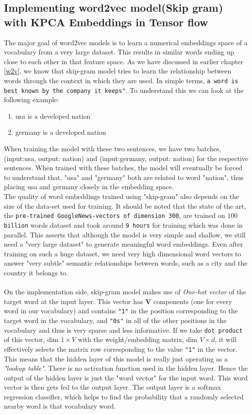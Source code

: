 \subsection{Implementing word2vec model(Skip gram) with KPCA Embeddings in Tensor flow}
The major goal of word2vec models is to learn a numerical embeddings space of a vocabulary from a very large dataset. This results in similar words ending up close to each other in that feature space. As we have discussed in earlier chapter \ref{w2v}, we know that skip-gram model tries to learn the relationship between words through the context in which they are used. In simple terms, \texttt{a word is best known by the company it keeps"}. To understand this we can look at the following example:
 \begin{enumerate}
 	\item usa is a developed nation
 	\item germany is a developed nation
 \end{enumerate}
 When training the model with these two sentences, we have two batches, (input:usa, output: nation) and (input:germany, output: nation) for the respective sentences. When trained with these batches, the model will eventually be forced to understand that, "usa" and "germany" both are related to word "nation", thus placing usa and germany closely in the embedding space.\\
 The quality of word embeddings trained using "skip-gram" also depends on the size of the data-set used for training. It should be noted that the state of the art, the \texttt{pre-trained GoogleNews-vectors of dimension 300}, are trained on \texttt{$100$ billion} words dataset and took around \texttt{9 hours} for training which was done in parallel. This asserts that although the model is very simple and shallow, we still need a "very large dataset" to generate meaningful word embeddings. Even after training on such a huge dataset, we need very high dimensional word vectors to answer "very subtle" semantic relationships between words, such as a city and the country it belongs to.\\\\
 On the implementation side, skip-gram model makes use of \textit{One-hot vector} of the target word at the input layer. This vector has $\mathbf{V}$ components (one for every word in our vocabulary) and contains \texttt{"1"} in the position corresponding to the target word in the vocabulary, and \texttt{"0s"} in all of the other positions in the vocabulary and thus is very sparse and less informative. If we take \texttt{dot product} of this vector, dim $1\times V$ with the weight/embedding matrix, dim $V \times d$, it will effectively selects the matrix row corresponding to the value \texttt{"1"} in the vector. This means that the hidden layer of this model is really just operating as a \textit{"lookup table"}. There is no activation function used in the hidden layer. Hence the output of the hidden layer is just the "word vector" for the input word. This word vector is then gets fed to the output layer. The output layer is a softmax regression classifier, which helps to find the probability that a randomly selected nearby word is that vocabulary word.\\\\
